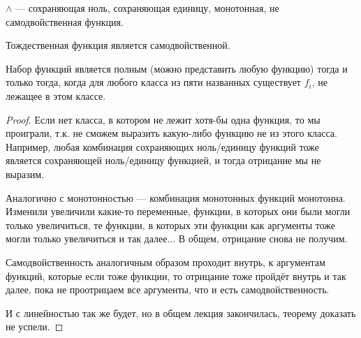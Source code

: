 \begin{example}
	$\land$ --- сохраняющая ноль, сохраняющая единицу, монотонная, не самодвойственная функция. 
	
	Тождественная функция является самодвойственной. 
\end{example}

\begin{theorem}
	Набор функций является полным (можно представить любую функцию) тогда и только тогда, когда для любого класса из пяти названных существует $f_i$, не лежащее в этом классе.
\end{theorem}
\begin{proof}
	Если нет класса, в котором не лежит хотя-бы одна функция, то мы проиграли, т.к. не сможем выразить какую-либо функцию не из этого класса. Например, любая комбинация сохраняющих ноль/единицу функций тоже является сохраняющей ноль/единицу функцией, и тогда отрицание мы не выразим.

	Аналогично с монотонностью --- комбинация монотонных функций монотонна. Изменили увеличили какие-то переменные, функции, в которых они были могли только увеличиться, те функции, в которых эти функции как аргументы тоже могли только увеличиться и так далее... В общем, отрицание снова не получим. 

	Самодвойственность аналогичным образом проходит внутрь, к аргументам функций, которые если тоже функции, то отрицание тоже пройдёт внутрь и так далее, пока не проотрицаем все аргументы, что и есть самодвойственность. 

	И с линейностью так же будет, но в общем лекция закончилась, теорему доказать не успели.
\end{proof}

